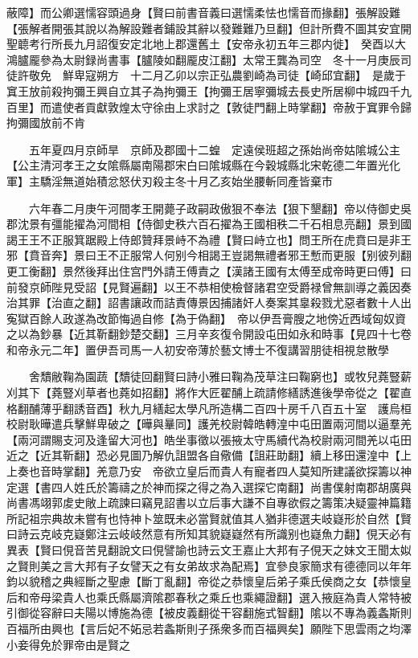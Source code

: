 蔽障】而公卿選懦容頭過身【賢曰前書音義曰選懦柔怯也懦音而掾翻】張解設難【張解者開張其說以為解設難者鋪設其辭以發難難乃旦翻】但計所費不圖其安宜開聖聼考行所長九月詔復安定北地上郡還舊土【安帝永初五年三郡内徙】　癸酉以大鴻臚龎參為太尉録尚書事【臚陵如翻龎皮江翻】太常王龔為司空　冬十一月庚辰司徒許敬免　鮮卑寇朔方　十二月乙卯以宗正弘農劉崎為司徒【崎邱宜翻】　是歲于窴王放前殺拘彌王興自立其子為拘彌王【拘彌王居寧彌城去長史所居柳中城四千九百里】而遣使者貢獻敦煌太守徐由上求討之【敦徒門翻上時掌翻】帝赦于窴罪令歸拘彌國放前不肯

　　五年夏四月京師旱　京師及郡國十二蝗　定遠侯班超之孫始尚帝姑隂城公主【公主清河孝王之女隂縣屬南陽郡宋白曰隂城縣在今穀城縣北宋乾德二年置光化軍】主驕淫無道始積忿怒伏刃殺主冬十月乙亥始坐腰斬同產皆棄市

　　六年春二月庚午河間孝王開薨子政嗣政傲狠不奉法【狠下墾翻】帝以侍御史吳郡沈景有彊能擢為河間相【侍御史秩六百石擢為王國相秩二千石相息亮翻】景到國謁王王不正服箕踞殿上侍郎贊拜景峙不為禮【賢曰峙立也】問王所在虎賁曰是非王邪【賁音奔】景曰王不正服常人何别今相謁王豈謁無禮者邪王慙而更服【别彼列翻更工衡翻】景然後拜出住宫門外請王傅責之【漢諸王國有太傅至成帝時更曰傅】曰前發京師陛見受詔【見賢遍翻】以王不恭相使檢督諸君空受爵禄曾無訓導之義因奏治其罪【治直之翻】詔書讓政而詰責傳景因捕諸奸人奏案其辠殺戮尤惡者數十人出寃獄百餘人政遂為改節悔過自修【為于偽翻】　帝以伊吾膏膄之地傍近西域匈奴資之以為鈔暴【近其靳翻鈔楚交翻】三月辛亥復令開設屯田如永和時事【見四十七卷和帝永元二年】置伊吾司馬一人初安帝薄於藝文博士不復講習朋徒相視怠散學

　　舍穨敝鞠為園蔬【穨徒回翻賢曰詩小雅曰鞠為茂草注曰鞠窮也】或牧兒蕘豎薪刈其下【蕘豎刈草者也蕘如招翻】將作大匠翟酺上疏請修繕誘進後學帝從之【翟直格翻酺薄乎翻誘音酉】秋九月繕起太學凡所造構二百四十房千八百五十室　護烏桓校尉耿曄遣兵擊鮮卑破之【曄與曅同】護羌校尉韓皓轉湟中屯田置兩河間以逼羣羌【兩河謂賜支河及逢留大河也】皓坐事徵以張掖太守馬續代為校尉兩河間羌以屯田近之【近其靳翻】恐必見圖乃解仇詛盟各自儆備【詛莊助翻】續上移田還湟中【上上奏也音時掌翻】羌意乃安　帝欲立皇后而貴人有寵者四人莫知所建議欲探籌以神定選【書四人姓氏於籌禱之於神而探之得之為入選探它南翻】尚書僕射南郡胡廣與尚書馮翊郭䖍史敞上疏諫曰竊見詔書以立后事大謙不自專欲假之籌策决疑靈神篇籍所記祖宗典故未嘗有也恃神卜筮既未必當賢就值其人猶非德選夫岐嶷形於自然【賢曰詩云克岐克嶷鄭注云岐岐然意有所知其貌嶷嶷然有所識别也嶷魚力翻】俔天必有異表【賢曰俔音苦見翻說文曰俔譬諭也詩云文王嘉止大邦有子俔天之妹文王聞太姒之賢則美之言大邦有子女譬天之有女弟故求為配焉】宜參良家簡求有德德同以年年鈞以貌稽之典經斷之聖慮【斷丁亂翻】帝從之恭懷皇后弟子乘氏侯商之女【恭懷皇后和帝母梁貴人也乘氏縣屬濟隂郡春秋之乘丘也乘繩證翻】選入掖庭為貴人常特被引御從容辭曰夫陽以博施為德【被皮義翻從干容翻施式智翻】隂以不專為義螽斯則百福所由興也【言后妃不妬忌若螽斯則子孫衆多而百福興矣】願陛下思雲雨之均澤小妾得免於罪帝由是賢之

